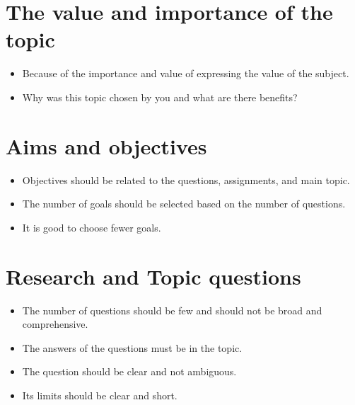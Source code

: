\section{The value and importance of the topic}
\begin{itemize}
	\item Because of the importance and value of expressing the value of the subject.
	\item Why was this topic chosen by you and what are there benefits?
	
\end{itemize}

\section{Aims and objectives}
\begin{itemize}
	\item Objectives should be related to the questions, assignments, and main topic.
	\item The number of goals should be selected based on the number of questions.
	\item It is good to choose fewer goals.
	
\end{itemize}

\section{Research and Topic questions}
\begin{itemize}
	\item The number of questions should be few and should not be broad and comprehensive.
	\item The answers of the questions must be in the topic.
	\item The question should be clear and not ambiguous.
	\item Its limits should be clear and short.
	
\end{itemize}

